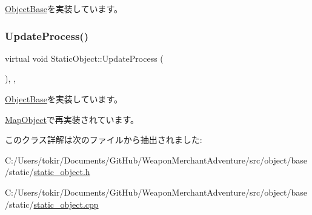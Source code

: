 \mbox{\hyperlink{class_object_base_aeac51d868beeb7f7fe900407b76b93a2}{Object\+Base}}を実装しています。

\mbox{\label{class_static_object_a7fa678c3c4032bb6e9417f93a8bb895c}} 
\subsubsection{\texorpdfstring{Update\+Process()}{UpdateProcess()}}
{\footnotesize\ttfamily virtual void Static\+Object\+::\+Update\+Process (\begin{DoxyParamCaption}{ }\end{DoxyParamCaption})\hspace{0.3cm}{\ttfamily [inline]}, {\ttfamily [protected]}, {\ttfamily [virtual]}}



\mbox{\hyperlink{class_object_base_a8b5b72b363a419767efde0b0e692ea95}{Object\+Base}}を実装しています。



\mbox{\hyperlink{class_map_object_ab6b8849f15175417eca94b2703945e4b}{Map\+Object}}で再実装されています。



このクラス詳解は次のファイルから抽出されました\+:\begin{DoxyCompactItemize}
\item 
C\+:/\+Users/tokir/\+Documents/\+Git\+Hub/\+Weapon\+Merchant\+Adventure/src/object/base/static/\mbox{\hyperlink{static__object_8h}{static\+\_\+object.\+h}}\item 
C\+:/\+Users/tokir/\+Documents/\+Git\+Hub/\+Weapon\+Merchant\+Adventure/src/object/base/static/\mbox{\hyperlink{static__object_8cpp}{static\+\_\+object.\+cpp}}\end{DoxyCompactItemize}
